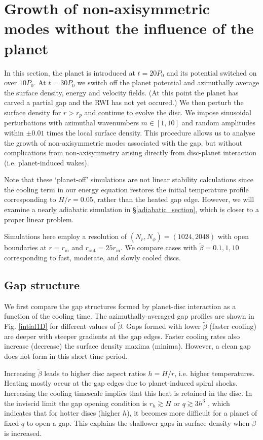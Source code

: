 \section{Growth of non-axisymmetric modes without the influence of the
  planet}\label{linear1} 
In this section, the planet is introduced at $t=20P_0$ and 
its potential switched on over $10P_0$. At $t=30P_0$ we switch off the
planet potential and azimuthally average the surface density, energy
and velocity fields. (At this point the planet has carved a partial
gap and the RWI has not yet occured.)
 We then perturb the surface density for $r>r_p$ and continue to 
evolve the disc. We impose  sinusoidal perturbations with 
azimuthal wavenumbers $m\in[1,10]$ and random amplitudes within $\pm 0.01$
 times the local surface density. 
This procedure allows us to analyse the growth of 
non-axisymmetric modes associated with the gap, but without
complications from non-axisymmetry arising directly from disc-planet
interaction (i.e. planet-induced wakes). 

Note that these `planet-off' simulations are not linear stability
calculations since the cooling term in our energy equation
restores the initial temperature profile corresponding to $H/r=0.05$,
rather than the heated gap edge. However, we will 
examine a nearly adiabatic simulation in \S\ref{adiabatic_section},
which is closer to a proper linear problem. 

Simulations here employ a resolution of $(N_r,N_{\phi})=(1024,2048)$
with open boundaries at $r=r_\mathrm{in}$ and
$r_\mathrm{out}=25r_\mathrm{in}$. We compare
cases with $\tilde{\beta}=0.1,1,10$ corresponding to fast, moderate,
and slowly cooled discs. 

\subsection{Gap structure}
We first compare the gap structures formed by planet-disc
interaction as a function of the cooling time. The azimuthally-averaged 
gap profiles are shown in Fig. \ref{intial1D} for different values of 
$\tilde\beta$. Gaps formed with lower $\tilde\beta$ (faster cooling) 
are deeper with steeper gradients at the gap edges. Faster cooling rates also 
increase (decrease) the surface density maxima (minima). However, a
clean gap does not form in this short time period.%

Increasing $\tilde\beta$ leads to higher disc aspect ratios $h=H/r$,
i.e. higher temperatures. Heating mostly occur at the gap edges
due to planet-induced spiral shocks. Increasing the cooling timescale 
implies that this heat is retained in the disc. In the inviscid limit the gap
opening condition is $r_h\gtrsim H$ or $q\gtrsim 3h^3$
\citep{crida06}, which indicates that for hotter discs (higher
$h$), it becomes more difficult for a planet of fixed $q$ to open a
gap. This explains the shallower gaps in surface density when
$\tilde{\beta}$ is increased. 

